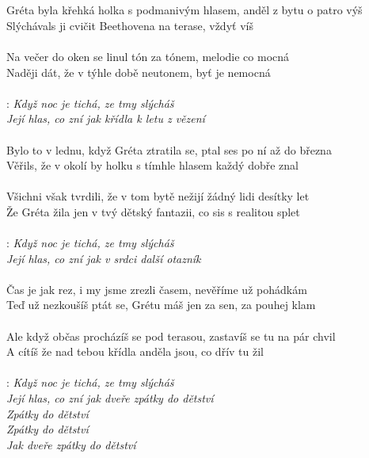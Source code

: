 
\begin{Large}

\\
\\
Gréta byla křehká holka s podmanivým hlasem, anděl z bytu o patro výš \\
Slýchávals ji cvičit Beethovena na terase, vždyť víš \\
\\
Na večer do oken se linul tón za tónem, melodie co mocná\\
Naději dát, že v týhle době neutonem, byť je nemocná\\
\\
\textregistered:
\emph{
 Když noc je tichá, ze tmy slýcháš\\
 Její hlas, co zní jak křídla k letu z vězení\\
}
\\
Bylo to v lednu, když Gréta ztratila se, ptal ses po ní až do března\\
Věřils, že v okolí by holku s tímhle hlasem každý dobře znal\\
\\
Všichni však tvrdili, že v tom bytě nežijí žádný lidi desítky let\\
Že Gréta žila jen v tvý dětský fantazii, co sis s realitou splet\\
\\
\textregistered:
\emph{
Když noc je tichá, ze tmy slýcháš\\
Její hlas, co zní jak v srdci další otazník\\
}
\\
Čas je jak rez, i my jsme zrezli časem, nevěříme už pohádkám\\
Teď už nezkoušíš ptát se, Grétu máš jen za sen, za pouhej klam\\
\\
Ale když občas procházíš se pod terasou, zastavíš se tu na pár chvil\\
A cítíš že nad tebou křídla anděla jsou, co dřív tu žil\\
\\
\textregistered:
\emph{
Když noc je tichá, ze tmy slýcháš\\
Její hlas, co zní jak dveře zpátky do dětství\\
Zpátky do dětství\\
Zpátky do dětství\\
Jak dveře zpátky do dětství
}

\end{Large}

\newpage
